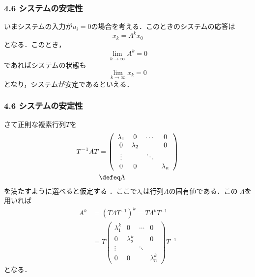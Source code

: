 \begin{frame}[t]
\frametitle{4.6 システムの安定性}
いまシステムの入力が$u_i = 0$の場合を考える．このときのシステムの応答は
\begin{equation}
 x_k = A^k x_0
\end{equation}
となる．このとき，
\begin{equation}
 \lim_{k \rightarrow \infty} A^k = 0
\end{equation}
であればシステムの状態も
\begin{equation}
 \lim_{k \rightarrow \infty} x_k = 0
\end{equation}
となり，システムが安定であるといえる．
\end{frame}

\begin{frame}[t]
\frametitle{4.6 システムの安定性}
さて正則な複素行列$T$を
\begin{align}
 T^{-1} A T
  &=
  \left(\begin{array}{cccc}
         \lambda_1 & 0         & \cdots & 0 \\
	 0         & \lambda_2 &        & 0 \\
	 \vdots    &           & \ddots & \\
	 0         & 0         &        & \lambda_n 
	\end{array}\right) \nonumber \\
 &\defeq \Lambda
\end{align}
を満たすように選べると仮定する
．ここで$\lambda_i$は行列$A$の固有値である．この
$\Lambda$を用いれば
\begin{align}
 A^k &= (T \Lambda T^{-1})^k = T \Lambda ^k T^{-1} \nonumber \\
 &= T
  \left(\begin{array}{cccc}
         \lambda_1^k & 0           & \cdots & 0 \\
	 0           & \lambda_2^k &        & 0 \\
	 \vdots      &             & \ddots & \\
	 0           & 0           &        & \lambda_n^k
	\end{array}\right)
  T^{-1}
\end{align}
となる．
\end{frame}

